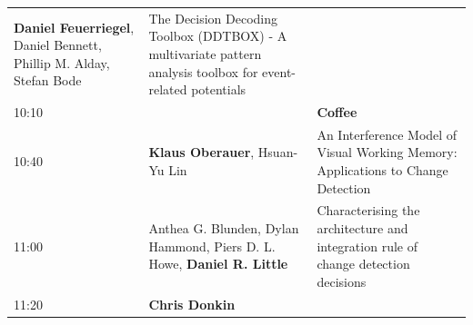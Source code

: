 \documentclass[]{article}
\begin{document}
\begin{longtable}[]{@{}lll@{}}
\begin{minipage}[t]{0.35\columnwidth}
\textbf{Daniel Feuerriegel}, Daniel Bennett, Phillip M. Alday, Stefan
Bode\strut
\end{minipage} & \begin{minipage}[t]{0.53\columnwidth}\raggedright\strut
The Decision Decoding Toolbox (DDTBOX) - A multivariate pattern analysis
toolbox for event-related potentials\strut
\end{minipage}\tabularnewline
\begin{minipage}[t]{0.03\columnwidth}\raggedright\strut
10:10\strut
\end{minipage} & \begin{minipage}[t]{0.35\columnwidth}\raggedright\strut
\strut
\end{minipage} & \begin{minipage}[t]{0.53\columnwidth}\raggedright\strut
\textbf{Coffee}\strut
\end{minipage}\tabularnewline
\begin{minipage}[t]{0.03\columnwidth}\raggedright\strut
10:40\strut
\end{minipage} & \begin{minipage}[t]{0.35\columnwidth}\raggedright\strut
\textbf{Klaus Oberauer}, Hsuan-Yu Lin\strut
\end{minipage} & \begin{minipage}[t]{0.53\columnwidth}\raggedright\strut
An Interference Model of Visual Working Memory: Applications to Change
Detection\strut
\end{minipage}\tabularnewline
\begin{minipage}[t]{0.03\columnwidth}\raggedright\strut
11:00\strut
\end{minipage} & \begin{minipage}[t]{0.35\columnwidth}\raggedright\strut
Anthea G. Blunden, Dylan Hammond, Piers D. L. Howe, \textbf{Daniel R.
Little}\strut
\end{minipage} & \begin{minipage}[t]{0.53\columnwidth}\raggedright\strut
Characterising the architecture and integration rule of change detection
decisions\strut
\end{minipage}\tabularnewline
\begin{minipage}[t]{0.03\columnwidth}\raggedright\strut
11:20\strut
\end{minipage} & \begin{minipage}[t]{0.35\columnwidth}\raggedright\strut
\textbf{Chris Donkin}\strut
\end{minipage} & \begin{minipage}[t]{0.53\columnwidth}\raggedright\strut

\end{minipage}
\end{longtable}
\end{document}
